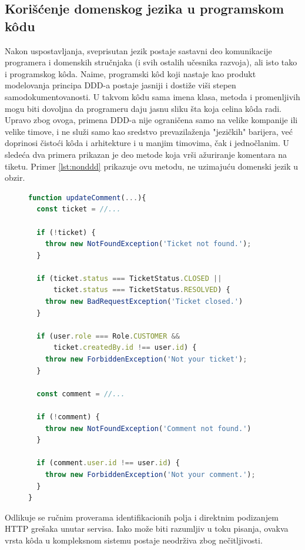 \documentclass[12pt,oneside]{memoir}
\begin{document}
\subsection{Korišćenje domenskog jezika u programskom k\^{o}du}
\label{sec:dddukodu}
Nakon uspostavljanja, sveprisutan jezik postaje sastavni deo komunikacije programera i domenskih stručnjaka (i svih ostalih učesnika razvoja), ali isto tako i programskog k\^{o}da. Naime, programski k\^{o}d koji nastaje kao produkt modelovanja principa DDD-a postaje jasniji i dostiže viši stepen samodokumentovanosti. U takvom k\^{o}du sama imena klasa, metoda i promenljivih mogu biti dovoljna da programeru daju jasnu sliku šta koja celina k\^{o}da radi. Upravo zbog ovoga, primena DDD-a nije ograničena samo na velike kompanije ili velike timove, i ne služi samo kao sredstvo prevazilaženja "jezičkih" barijera, već doprinosi čistoći k\^{o}da i arhitekture i u manjim timovima, čak i jednočlanim. U sledeća dva primera prikazan je deo metode koja vrši ažuriranje komentara na tiketu. Primer \ref{lst:nonddd} prikazuje ovu metodu, ne uzimajuću domenski jezik u obzir.


\begin{figure}[h]
\begin{lstlisting}[language=JavaScript, style=ES6, caption={K\^{o}d koji nije na domenskom jeziku}, label={lst:nonddd}]
function updateComment(...){
  const ticket = //...
  
  if (!ticket) {
    throw new NotFoundException('Ticket not found.');
  }

  if (ticket.status === TicketStatus.CLOSED ||
      ticket.status === TicketStatus.RESOLVED) {
    throw new BadRequestException('Ticket closed.')
  }

  if (user.role === Role.CUSTOMER &&
      ticket.createdBy.id !== user.id) {
    throw new ForbiddenException('Not your ticket');
  }
  
  const comment = //...
  
  if (!comment) {
    throw new NotFoundException('Comment not found.')
  }
  
  if (comment.user.id !== user.id) {
    throw new ForbiddenException('Not your comment.');
  }
}
\end{lstlisting}
\end{figure}
\newpage
Odlikuje se ručnim proverama identifikacionih polja i direktnim podizanjem HTTP grešaka unutar servisa. Iako može biti razumljiv u toku pisanja, ovakva vrsta k\^{o}da u kompleksnom sistemu postaje neodrživa zbog nečitljivosti.
\end{document}
